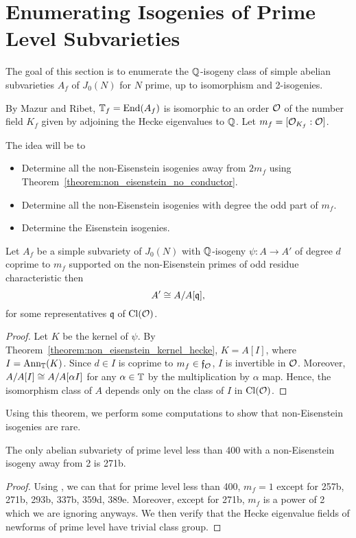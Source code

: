 \documentclass{article}
\begin{document}
    
\section{Enumerating Isogenies of Prime Level Subvarieties}

The goal of this section is to enumerate the $\mathbb{Q}$-isogeny class of simple
abelian subvarieties $A_f$ of $J_0(N)$ for $N$ prime, up to isomorphism and
2-isogenies.


By Mazur and Ribet, $\mathbb{T}_f=\operatorname{End}(A_f)$ is isomorphic to an order $\mathcal{O}$ of the
number field $K_f$ given by adjoining the Hecke eigenvalues to $\mathbb{Q}$. Let
$m_f=[\mathcal{O}_{K_f}:\mathcal{O}]$. 

The idea will be to
\begin{itemize}
    \item 
        Determine all the non-Eisenstein isogenies away from $2m_f$ using
        Theorem~\ref{theorem:non_eisenstein_no_conductor}.
    \item
        Determine all the non-Eisenstein isogenies with degree the odd part of
        $m_f$.
    \item
        Determine the Eisenstein isogenies.
\end{itemize}

\begin{theorem}\label{theorem:non_eisenstein_no_conductor}
    Let $A_f$ be a simple subvariety of $J_0(N)$ with $\mathbb{Q}$-isogeny $\psi:A\to
    A'$ of degree $d$ coprime to $m_f$ supported on the non-Eisenstein primes
    of odd residue characteristic then
    \[
        A' \cong A/A[\mathfrak{q}],
    \]
    for some representatives $\mathfrak{q}$ of $\operatorname{Cl}(\mathcal{O})$.
\end{theorem}
\begin{proof}
    Let $K$ be the kernel of $\psi$. By
    Theorem~\ref{theorem:non_eisenstein_kernel_hecke}, $K=A[I]$, where
    $I=\operatorname{Ann}_{\mathbb{T}}(K)$. Since $d\in I$ is coprime to $m_f\in \mathfrak{f}_{\mathcal{O}}$,
    $I$ is invertible in $\mathcal{O}$. Moreover, $A/A[I]\cong A/A[\alpha I]$ for any
    $\alpha\in \mathbb{T}$ by the multiplication by $\alpha$ map. Hence, the
    isomorphism class of $A$ depends only on the class of $I$ in $\operatorname{Cl}(\mathcal{O})$.
\end{proof}

Using this theorem, we perform some computations to show that non-Eisenstein
isogenies are rare.
\begin{proposition}
    The only abelian subvariety of prime level less than 400 with a
    non-Eisenstein isogeny away from 2 is 271b.
\end{proposition}
\begin{proof}
    Using \sage, we can that for prime level less than 400, $m_f=1$ except for
    257b, 271b, 293b, 337b, 359d, 389e. Moreover, except for 271b, $m_f$ is a
    power of 2 which we are ignoring anyways. We then verify that the Hecke
    eigenvalue fields of newforms of prime level have trivial class group.
\end{proof}
\end{document}
